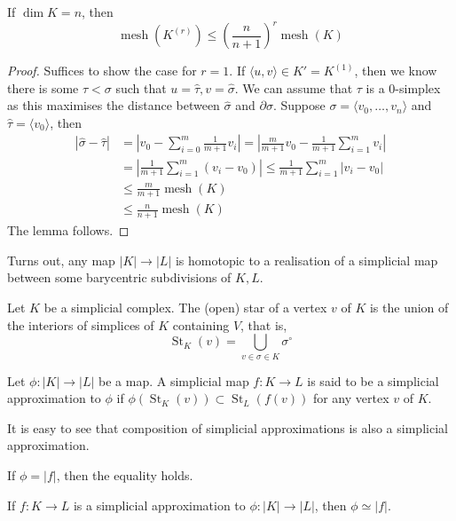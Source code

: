 \begin{lemma}
    If $\dim K=n$, then
    $$\operatorname{mesh}(K^{(r)})\le\left( \frac{n}{n+1} \right)^r\operatorname{mesh}(K)$$
\end{lemma}
\begin{proof}
    Suffices to show the case for $r=1$.
    If $\langle u,v\rangle\in K'=K^{(1)}$, then we know there is some $\tau<\sigma$ such that $u=\hat\tau,v=\hat\sigma$.
    We can assume that $\tau$ is a $0$-simplex as this maximises the distance between $\hat\sigma$ and $\partial\sigma$.
    Suppose $\sigma=\langle v_0,\ldots,v_n\rangle$ and $\hat\tau=\langle v_0\rangle$, then
    \begin{align*}
        |\hat\sigma-\hat\tau|&=\left|v_0-\sum_{i=0}^m\frac{1}{m+1}v_i\right|=\left|\frac{m}{m+1}v_0-\frac{1}{m+1}\sum_{i=1}^mv_i\right|\\
        &=\left|\frac{1}{m+1}\sum_{i=1}^m(v_i-v_0)\right|\le\frac{1}{m+1}\sum_{i=1}^m|v_i-v_0|\\
        &\le\frac{m}{m+1}\operatorname{mesh}(K)\\
        &\le\frac{n}{n+1}\operatorname{mesh}(K)
    \end{align*}
    The lemma follows.
\end{proof}
Turns out, any map $|K|\to|L|$ is homotopic to a realisation of a simplicial map between some barycentric subdivisions of $K,L$.
\begin{definition}
    Let $K$ be a simplicial complex.
    The (open) star of a vertex $v$ of $K$ is the union of the interiors of simplices of $K$ containing $V$, that is,
    $$\operatorname{St}_K(v)=\bigcup_{v\in\sigma\in K}\sigma^\circ$$
\end{definition}
\begin{definition}
    Let $\phi:|K|\to|L|$ be a map.
    A simplicial map $f:K\to L$ is said to be a simplicial approximation to $\phi$ if $\phi(\operatorname{St}_K(v))\subset\operatorname{St}_L(f(v))$ for any vertex $v$ of $K$.
\end{definition}
It is easy to see that composition of simplicial approximations is also a simplicial approximation.
\begin{note}
    If $\phi=|f|$, then the equality holds.
\end{note}
\begin{lemma}
    If $f:K\to L$ is a simplicial approximation to $\phi:|K|\to|L|$, then $\phi\simeq|f|$.
\end{lemma}
